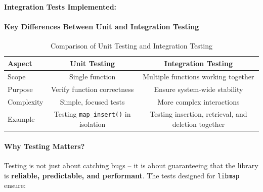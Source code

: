 \documentclass[titlepage]{article}
\begin{document}
\textbf{Integration Tests Implemented:}

\begin{table}[h]
    \centering
    \renewcommand{\arraystretch}{1.3}
    \caption{Overview of Integration Tests in \texttt{libmap}}
\end{table}


\paragraph{Key Differences Between Unit and Integration Testing}

\begin{table}[h]
    \centering
    \renewcommand{\arraystretch}{1.3}
    \begin{tabular}{@{} l c c @{} }
        \toprule
        \textbf{Aspect} & \textbf{Unit Testing} & \textbf{Integration Testing} \\
        \midrule
        Scope & Single function & Multiple functions working together \\
        Purpose & Verify function correctness & Ensure system-wide stability \\
        Complexity & Simple, focused tests & More complex interactions \\
        Example & Testing \texttt{map\_insert()} in isolation & Testing insertion, retrieval, and deletion together \\
        \bottomrule
    \end{tabular}
    \caption{Comparison of Unit Testing and Integration Testing}
\end{table}

\paragraph{Why Testing Matters?}
Testing is not just about catching bugs -- it is about guaranteeing that the library is \textbf{reliable, predictable, and performant}. The tests designed for \texttt{libmap} ensure:
\end{document}
